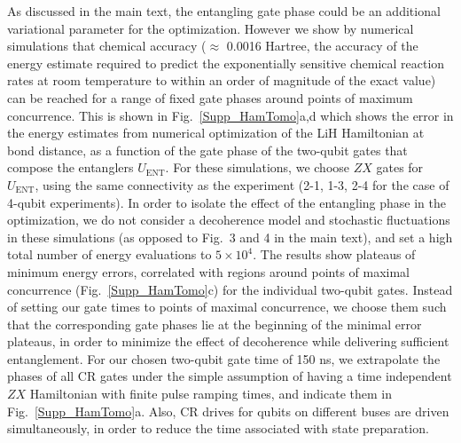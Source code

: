 \documentclass[twocolumn]{revtex4-1}
\newcommand{\1}{\mathbbm{1}}
\begin{document}
As discussed in the main text, the entangling gate phase could be an additional variational parameter for the optimization. However we show by numerical simulations that chemical accuracy ($\approx$ 0.0016 Hartree, the accuracy of the energy estimate required to predict the exponentially sensitive chemical reaction rates at room temperature to within an order of magnitude of the exact value) can be reached for a range of fixed gate phases around points of maximum concurrence. This is shown in Fig.~\ref{Supp_HamTomo}a,d which shows the error in the energy estimates from numerical optimization of the LiH Hamiltonian at bond distance, as a function of the gate phase of the two-qubit gates that compose the entanglers $U_\textrm{ENT}$.  For these simulations, we choose $ZX$ gates for $U_\textrm{ENT}$, using the same connectivity as the experiment (2-1, 1-3, 2-4 for the case of 4-qubit experiments). In order to isolate the effect of the entangling phase in the optimization, we do not consider a decoherence model and stochastic fluctuations in these simulations (as opposed to Fig.~3 and 4 in the main text), and set a high total number of energy evaluations to $5\times10^4$.  The results show plateaus of minimum energy errors, correlated with regions around points of maximal concurrence (Fig.~\ref{Supp_HamTomo}c) for the individual two-qubit gates. Instead of setting our gate times to points of maximal concurrence, we choose them such that the corresponding gate phases lie at the beginning of the minimal error plateaus, in order to minimize the effect of decoherence while delivering sufficient entanglement. For our chosen two-qubit gate time of 150 ns, we extrapolate the phases of all CR gates under the simple assumption of having a time independent $ZX$ Hamiltonian with finite pulse ramping times, and indicate them in Fig.~\ref{Supp_HamTomo}a. Also, CR drives for qubits on different buses are driven simultaneously, in order to reduce the time associated with state preparation.
\end{document}
